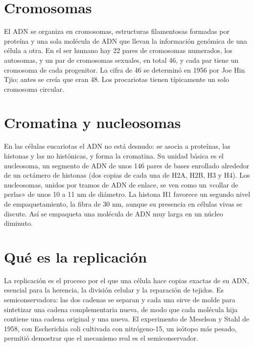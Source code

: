 \documentclass{book}
\begin{document}

\section{Cromosomas}

El ADN se organiza en cromosomas, estructuras filamentosas formadas por proteína y una sola molécula de ADN que llevan la información genómica de una célula a otra. En el ser humano hay 22 pares de cromosomas numerados, los autosomas, y un par de cromosomas sexuales, en total 46, y cada par tiene un cromosoma de cada progenitor. La cifra de 46 se determinó en 1956 por Joe Hin Tjio; antes se creía que eran 48. Los procariotas tienen típicamente un solo cromosoma circular.


\section{Cromatina y nucleosomas}

En las células eucariotas el ADN no está desnudo: se asocia a proteínas, las histonas y las no histónicas, y forma la cromatina. Su unidad básica es el nucleosoma, un segmento de ADN de unos 146 pares de bases enrollado alrededor de un octámero de histonas (dos copias de cada una de H2A, H2B, H3 y H4). Los nucleosomas, unidos por tramos de ADN de enlace, se ven como un «collar de perlas» de unos 10 a 11 nm de diámetro. La histona H1 favorece un segundo nivel de empaquetamiento, la fibra de 30 nm, aunque su presencia en células vivas se discute. Así se empaqueta una molécula de ADN muy larga en un núcleo diminuto.


\section{Qué es la replicación}

La replicación es el proceso por el que una célula hace copias exactas de su ADN, esencial para la herencia, la división celular y la reparación de tejidos. Es semiconservadora: las dos cadenas se separan y cada una sirve de molde para sintetizar una cadena complementaria nueva, de modo que cada molécula hija contiene una cadena original y una nueva. El experimento de Meselson y Stahl de 1958, con Escherichia coli cultivada con nitrógeno-15, un isótopo más pesado, permitió demostrar que el mecanismo real es el semiconservador.
\end{document}
